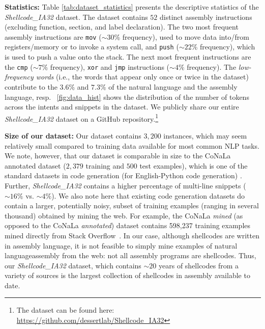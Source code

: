 \documentclass[11pt,a4paper]{article}
\newcommand{\datasetname}[1]{\emph{Shellcode\_IA32}}
\begin{document}
\noindent
\textbf{Statistics:} Table \ref{tab:dataset_statistics} presents the descriptive statistics of the \datasetname{} dataset.
The dataset contains $52$ distinct assembly instructions (excluding function, section, and label declaration).  
The two most frequent assembly instructions are \texttt{mov} ($\sim30$\% frequency), used to move data into/from registers/memory or to invoke a system call, and \texttt{push} ($\sim22$\% frequency), which is used to push a value onto the stack. The next most frequent instructions are the \texttt{cmp} ($\sim 7\%$ frequency), \texttt{xor} and \texttt{jmp} instructions ($\sim 4\%$ frequency). 
The \textit{low-frequency words} (i.e., the words that appear only once or twice in the dataset) contribute to the $3.6\%$ and $7.3\%$ of the natural language and the assembly language, resp. 
\figurename{}~\ref{fig:data_hist} shows the distribution of the number of tokens across the intents and snippets in the dataset.
We publicly share our entire \datasetname{} dataset on a GitHub repository.\footnote{The dataset can be found here: \url{https://github.com/dessertlab/Shellcode_IA32}}

\noindent
\textbf{Size of our dataset:} Our dataset contains $3,200$ instances, which may seem relatively small compared to training data available for most common NLP tasks. We note, however, that our dataset is comparable in size to the CoNaLa annotated dataset ($2,379$ training and $500$ test examples), which is one of the standard datasets in code generation  (for English-Python code generation) \cite{yin2018mining}. Further, \datasetname{} contains a higher percentage of multi-line snippets ($\sim16\%$ vs. $\sim4\%$). We also note here that existing code generation datasets do contain a larger, potentially noisy, subset of training examples (ranging in several thousand) obtained by mining the web. For example, the CoNaLa \textit{mined} (as opposed to the CoNaLa \textit{annotated}) dataset contains 598,237 training examples mined directly from  Stack Overflow~\cite{yin2018mining}. In our case, although shellcodes are written in assembly language, it is not feasible to simply mine examples of natural language\textendash assembly from the web: not all assembly programs are shellcodes.
Thus, our \datasetname{} dataset, which contains $\sim20$ years of shellcodes from a variety of sources is the largest collection of shellcodes in assembly available to date.  
\end{document}
